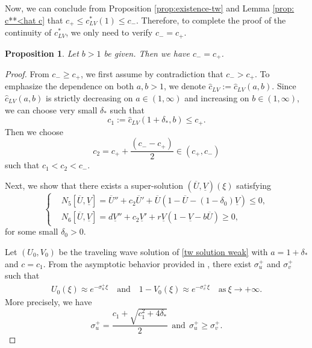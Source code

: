 \documentclass[11pt,a4paper]{article}
\newtheorem{proposition}[theorem]{\textbf{Proposition}}
\numberwithin{equation}{section}
\numberwithin{figure}{section}
\newcommand{\red}[1]{{\color{red}#1}}
\newcommand\bea{\begin{eqnarray}}
\newcommand\eea{\end{eqnarray}}
\begin{document}
Now, we can conclude from Proposition \ref{prop:existence-tw} and Lemma \ref{prop: c**<hat c} that $c_+\le c^*_{LV}(1)\le c_-$. Therefore, to complete the proof of the continuity of $c^*_{LV}$, we only need to verify $c_-=c_+$.
\begin{proposition}\label{prop: c**=c*}
Let $b>1$ be given. Then we have $c_-=c_+$.
\end{proposition}
\begin{proof}
From $c_-\ge  c_+$, we first assume by contradiction that 
$c_->c_+$. To emphasize the dependence on both $a,b>1$, we denote $\hat c_{LV}:=\hat c_{LV}(a,b)$. Since $\hat c_{LV}(a,b)$ is strictly decreasing on $a\in(1,\infty)$ and increasing on $b\in(1,\infty)$, we can choose very small $\delta_*$ such that 
$$c_1:=\hat c_{LV}(1+\delta_*,b)\le c_+.$$
Then we choose
$$c_2=c_++\frac{(c_--c_+)}{2}\in (c_+,c_-)$$ 
such that $c_1<c_2< c_-$.

Next, we show that there exists a super-solution $(\overline U,\underline V)(\xi)$ satisfying 
\begin{equation}\label{def: super solution 1}
\left\{
\begin{aligned}
&N_5[\overline U,\underline V]=\overline U''+c_2\overline U'+\overline U(1-\overline U-(1-\delta_0)\underline V)\le 0,\\
&N_6[\overline U,\underline V]=d\underline V''+c_2\underline V'+r\underline V(1-\underline V-b\overline U)\ge 0,
\end{aligned}
\right.
\end{equation}
for some small $\delta_0>0$.

Let $(U_0,V_0)$ be the traveling wave solution of \eqref{tw solution weak} with $a=1+\delta_*$ and $c=c_1$. 
From the asymptotic behavior provided in \cite{Kan-On}, there exist $\sigma_u^{+}$ and $\sigma_v^+$ such that
\bea\label{U1 V1 +infty exponential}
U_0(\xi)\approx e^{-\sigma_u^+\xi}\quad\text{and}\quad 1-V_0(\xi)\approx e^{-\sigma_v^+\xi}\quad\text{as}\ \xi\to+\infty.
\eea
More precisely, we have 
\begin{equation}\label{delta 3}
\sigma_u^+=\frac{c_1+\sqrt{c_1^2+4\delta_*}}{2}\ \ \text{and}\ \ \sigma_u^+\ge \sigma_v^+.
\end{equation}



\end{proof}
\end{document}
